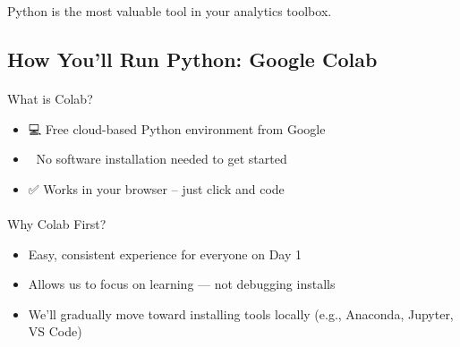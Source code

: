 \documentclass[
  letterpaper,
  DIV=11,
  numbers=noendperiod]{scrartcl}
\makeatletter
\let\oldparagraph\paragraph
\renewcommand{\paragraph}{
    \@ifstar
      \xxxParagraphStar
      \xxxParagraphNoStar
  }
\newcommand{\xxxParagraphStar}[1]{\oldparagraph*{#1}\mbox{}}
\newcommand{\xxxParagraphNoStar}[1]{\oldparagraph{#1}\mbox{}}
\providecommand{\tightlist}{%
  \setlength{\itemsep}{0pt}\setlength{\parskip}{0pt}}
\makeatother
\begin{document}
\begin{tcolorbox}[enhanced jigsaw, colbacktitle=quarto-callout-important-color!10!white, opacityback=0, colback=white, opacitybacktitle=0.6, toptitle=1mm, left=2mm, bottomrule=.15mm, breakable, bottomtitle=1mm, rightrule=.15mm, titlerule=0mm, title=\textcolor{quarto-callout-important-color}{\faExclamation}\hspace{0.5em}{Important}, coltitle=black, colframe=quarto-callout-important-color-frame, arc=.35mm, toprule=.15mm, leftrule=.75mm]

Python is the most valuable tool in your analytics toolbox.

\end{tcolorbox}

\subsection{How You'll Run Python: Google
Colab}\label{how-youll-run-python-google-colab}

\paragraph{What is Colab?}\label{what-is-colab}

\begin{itemize}
\tightlist
\item
  💻 Free cloud-based Python environment from Google
\item
  🚫 No software installation needed to get started
\item
  ✅ Works in your browser -- just click and code
\end{itemize}

\paragraph{Why Colab First?}\label{why-colab-first}

\begin{itemize}
\tightlist
\item
  Easy, consistent experience for everyone on Day 1
\item
  Allows us to focus on learning --- not debugging installs
\item
  We'll gradually move toward installing tools locally (e.g., Anaconda,
  Jupyter, VS Code)
\end{itemize}
\end{document}

